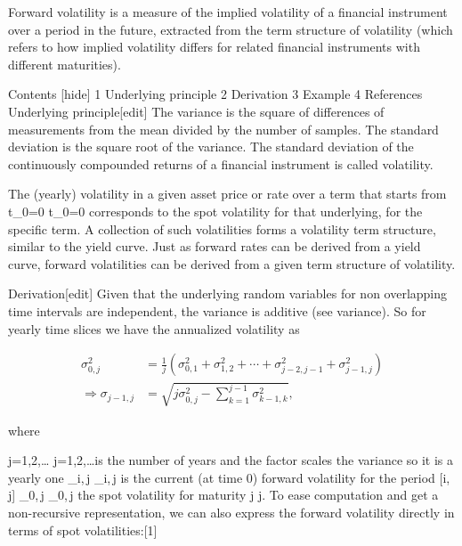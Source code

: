 Forward volatility is a measure of the implied volatility of a financial instrument over a period in the future, extracted from the term structure of volatility (which refers to how implied volatility differs for related financial instruments with different maturities).

Contents  [hide] 
1	Underlying principle
2	Derivation
3	Example
4	References
Underlying principle[edit]
The variance is the square of differences of measurements from the mean divided by the number of samples. The standard deviation is the square root of the variance. The standard deviation of the continuously compounded returns of a financial instrument is called volatility.

The (yearly) volatility in a given asset price or rate over a term that starts from {\displaystyle t_{0}=0} t_{0}=0 corresponds to the spot volatility for that underlying, for the specific term. A collection of such volatilities forms a volatility term structure, similar to the yield curve. Just as forward rates can be derived from a yield curve, forward volatilities can be derived from a given term structure of volatility.

Derivation[edit]
Given that the underlying random variables for non overlapping time intervals are independent, the variance is additive (see variance). So for yearly time slices we have the annualized volatility as

{} \begin{align}
\sigma_{0,j}^2
&= \frac{1}{j}(\sigma_{0,1}^2 + \sigma_{1,2}^2 + \cdots  + \sigma_{j-2,j-1}^2 + \sigma_{j-1,j}^2)\\
\Rightarrow \sigma_{j-1,j}
&=\sqrt{j\sigma_{0,j}^2-\sum_{k=1}^{j-1}\sigma_{k-1,k}^2},
\end{align}

where

{\displaystyle j=1,2,\ldots } j=1,2,\ldots is the number of years and the factor {}  scales the variance so it is a yearly one
{\displaystyle \sigma _{i,\,j}} \sigma_{i,\,j} is the current (at time 0) forward volatility for the period {\displaystyle [i,\,j]} [i,\,j]
{\displaystyle \sigma _{0,\,j}} \sigma_{0,\,j} the spot volatility for maturity {\displaystyle j} j.
To ease computation and get a non-recursive representation, we can also express the forward volatility directly in terms of spot volatilities:[1]

